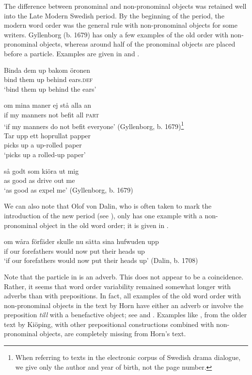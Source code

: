 \documentclass[output=paper]{langscibook}
\begin{document}
The difference between pronominal and non-pronominal objects was retained well into the Late Modern Swedish period. By the beginning of the period, the modern word order was the general rule with non-pronominal objects for some writers. Gyllenborg (b. 1679) has only a few examples of the old order with non-pronominal objects, whereas around half of the pronominal objects are placed before a particle. Examples are given in  and .


\ea\label{ex:lalu:37}
\ea\label{ex:lalu:37a}
\gll  Binda   dem     up     bakom   öronen\\
    bind     them     up     behind   ears\textsc{.def}\\
\glt `bind them up behind the ears'

\ex\label{ex:lalu:37b}
\gll  om   mina   maner     ej     stå   alla   an \\
    if     my     manners   not   befit   all   \textsc{part}\\
\glt `if my manners do not befit everyone'      (Gyllenborg, b. 1679)\footnote{When referring to texts in the electronic corpus of Swedish drama dialogue, we give only the author and year of birth, not the page number.} \\
\z
\ex\label{ex:lalu:38}
\ea
\gll  Tar   upp   ett   hoprullat   papper\\
    picks     up   a     up-rolled     paper\\
\glt `picks up a rolled-up paper'

\ex
\gll  så    godt   som   kiöra    ut     mig \\
    as    good   as     drive     out   me\\
\glt `as good as expel me’ (Gyllenborg, b. 1679)\\
\z
\z


We can also note that Olof von Dalin, who is often taken to mark the introduction of the new period (see ), only has one example with a non-pronominal object in the old word order; it is given in .


\ea\label{ex:lalu:39}
\gll  om   wåra   förfäder       skulle   nu   sätta   sina   hufwuden   upp\\
if     our     forefathers     would   now   put   their     heads     up\\
\glt `if our forefathers would now put their heads up’ (Dalin, b. 1708)\\
\z


Note that the particle in  is an adverb. This does not appear to be a coincidence. Rather, it seems that word order variability remained somewhat longer with adverbs than with prepositions. In fact, all examples of the old word order with non-pronominal objects in the text by Horn have either an adverb or involve the preposition \textit{till} with a benefactive object; see  and . Examples like , from the older text by Kiöping, with other prepositional constructions combined with non-pronominal objects, are completely missing from Horn’s text.
\end{document}
